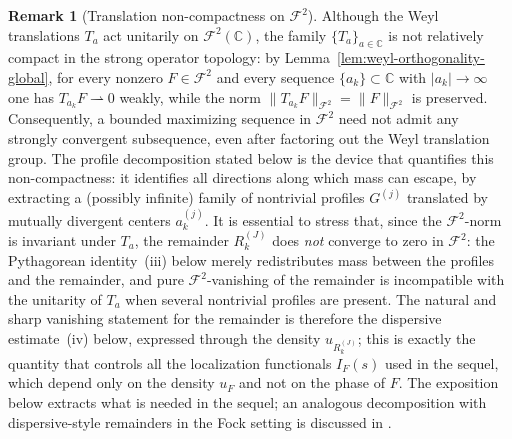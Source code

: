 \documentclass[a4paper,11pt,reqno]{amsart}
\numberwithin{equation}{section}
\theoremstyle{plain} %
\theoremstyle{definition} %
\newtheorem{remark}{Remark}[section]
\theoremstyle{remark}
\newcommand{\C}{\mathbb{C}}
\begin{document}
\begin{remark}[Translation non-compactness on \(\mathcal F^2\)]\label{rmk:translation-noncompact}
Although the Weyl translations \(T_a\) act unitarily on \(\mathcal F^2(\C)\),
the family \(\{T_a\}_{a\in\C}\) is not relatively compact in the strong
operator topology: by Lemma~\ref{lem:weyl-orthogonality-global}, for every
nonzero \(F\in \mathcal F^2\) and every sequence \(\{a_k\}\subset \C\) with
\(|a_k|\to\infty\) one has \(T_{a_k}F\rightharpoonup 0\) weakly, while the
norm \(\|T_{a_k}F\|_{\mathcal F^2}=\|F\|_{\mathcal F^2}\) is preserved.
Consequently, a bounded maximizing sequence in \(\mathcal F^2\) need not
admit any strongly convergent subsequence, even after factoring out the
Weyl translation group. The profile decomposition stated below is the
device that quantifies this non-compactness: it identifies all directions
along which mass can escape, by extracting a (possibly infinite) family of
nontrivial profiles \(G^{(j)}\) translated by mutually divergent centers
\(a_k^{(j)}\). It is essential to stress that, since the
\(\mathcal F^2\)-norm is invariant under \(T_a\), the remainder
\(R_k^{(J)}\) does \emph{not} converge to zero in \(\mathcal F^2\): the
Pythagorean identity~(iii) below merely redistributes mass between the
profiles and the remainder, and pure \(\mathcal F^2\)-vanishing of the
remainder is incompatible with the unitarity of \(T_a\) when several
nontrivial profiles are present. The natural and sharp vanishing statement
for the remainder is therefore the dispersive estimate~(iv) below,
expressed through the density \(u_{R_k^{(J)}}\); this is exactly the
quantity that controls all the localization functionals \(I_F(s)\) used in
the sequel, which depend only on the density \(u_F\) and not on the phase
of \(F\). The exposition below extracts what is needed in the sequel; an
analogous decomposition with dispersive-style remainders in the Fock
setting is discussed in
\cite{Nicola-Romero-Trapasso,Marceca-Romero-Speckbacher,Fulsche-Hagger,Samuelsen}.
\end{remark}
\end{document}
